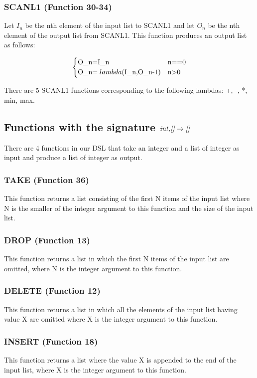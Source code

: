 \subsubsection{SCANL1 (Function 30-34)}
Let $I_n$ be the nth element of the input list to SCANL1 and let $O_n$ be the nth element of the output list from SCANL1.  This function produces an output list as follows:

\[ \begin{cases} 
      $O\_n$=$I\_n$ & $n$==$0$ \\
      $O\_n$=lambda($I\_n$,$O\_{n-1}$) & $n$>$0$ 
   \end{cases}
\]

There are 5 SCANL1 functions corresponding to the following lambdas: +, -, *, min, max.

\subsection{Functions with the signature $\emph{int,{[]}} \rightarrow \emph{[]}$}
There are 4 functions in our DSL that take an integer and a list of integer as input and produce a list of integer as output.
\subsubsection{TAKE (Function 36)}
This function returns a list consisting of the first N items of the input list where N is the smaller of the integer argument to this function and the size of the input list.
\subsubsection{DROP (Function 13)}
This function returns a list in which the first N items of the input list are omitted, where N is the integer argument to this function.
\subsubsection{DELETE (Function 12)}
This function returns a list in which all the elements of the input list having value X are omitted where X is the integer argument to this function.
\subsubsection{INSERT (Function 18)}
This function returns a list where the value X is appended to the end of the input list, where X is the integer argument to this function.


